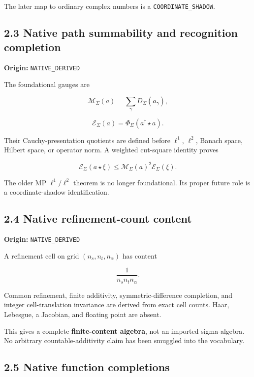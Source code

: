 The later map to ordinary complex numbers is a \texttt{COORDINATE\_SHADOW}.

\hypertarget{native-path-summability-and-recognition-completion}{%
\subsection{2.3 Native path summability and recognition completion}\label{native-path-summability-and-recognition-completion}}

\textbf{Origin:} \texttt{NATIVE\_DERIVED}

The foundational gauges are

\[
\mathcal M_\Sigma(a)
=
\sum_\gamma D_\Sigma(a_\gamma),
\]

\[
\mathcal E_\Sigma(a)
=
\Phi_\Sigma(a^\dagger\star a).
\]

Their Cauchy-presentation quotients are defined before \(\ell^1\), \(\ell^2\),
Banach space, Hilbert space, or operator norm. A weighted cut-square identity
proves

\[
\mathcal E_\Sigma(a\star\xi)
\le
\mathcal M_\Sigma(a)^2\mathcal E_\Sigma(\xi).
\]

The older MP \(\ell^1/\ell^2\) theorem is no longer foundational. Its proper
future role is a coordinate-shadow identification.

\hypertarget{native-refinement-count-content}{%
\subsection{2.4 Native refinement-count content}\label{native-refinement-count-content}}

\textbf{Origin:} \texttt{NATIVE\_DERIVED}

A refinement cell on grid \((n_s,n_t,n_\alpha)\) has content

\[
\frac1{n_sn_tn_\alpha}.
\]

Common refinement, finite additivity, symmetric-difference completion, and
integer cell-translation invariance are derived from exact cell counts. Haar,
Lebesgue, a Jacobian, and floating point are absent.

This gives a complete \textbf{finite-content algebra}, not an imported sigma-algebra.
No arbitrary countable-additivity claim has been smuggled into the vocabulary.

\hypertarget{native-function-completions}{%
\subsection{2.5 Native function completions}\label{native-function-completions}}

